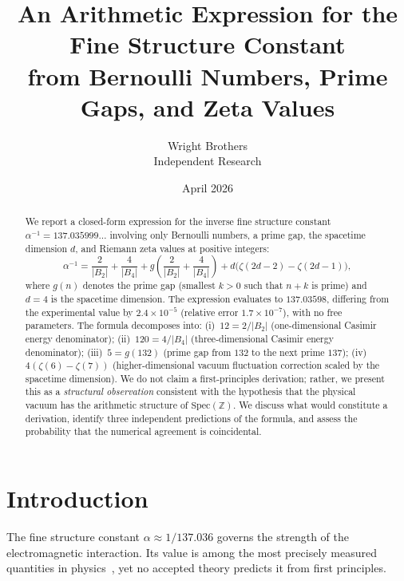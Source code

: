 \documentclass[11pt,a4paper]{article}
\newcommand{\Spec}{\mathrm{Spec}}
\begin{document}
\title{An Arithmetic Expression for the Fine Structure Constant\\
  from Bernoulli Numbers, Prime Gaps, and Zeta Values}

\author{Wright Brothers\\{\small Independent Research}}
\date{April 2026}
\maketitle

\begin{abstract}
We report a closed-form expression for the inverse fine structure
constant $\alpha^{-1} = 137.035999\ldots$ involving only Bernoulli
numbers, a prime gap, the spacetime dimension $d$, and Riemann
zeta values at positive integers:
\begin{equation*}
  \alpha^{-1} = \frac{2}{|B_2|} + \frac{4}{|B_4|}
  + g\!\left(\frac{2}{|B_2|} + \frac{4}{|B_4|}\right)
  + d\bigl(\zeta(2d{-}2) - \zeta(2d{-}1)\bigr),
\end{equation*}
where $g(n)$ denotes the prime gap (smallest $k > 0$ such that
$n + k$ is prime) and $d = 4$ is the spacetime dimension.
The expression evaluates to $137.03598$, differing from the
experimental value by $2.4 \times 10^{-5}$ (relative error
$1.7 \times 10^{-7}$), with no free parameters.
The formula decomposes into: (i)~$12 = 2/|B_2|$
(one-dimensional Casimir energy denominator);
(ii)~$120 = 4/|B_4|$ (three-dimensional Casimir energy denominator);
(iii)~$5 = g(132)$ (prime gap from $132$ to the next prime $137$);
(iv)~$4(\zeta(6) - \zeta(7))$ (higher-dimensional vacuum
fluctuation correction scaled by the spacetime dimension).
We do not claim a first-principles derivation; rather, we
present this as a \emph{structural observation} consistent with
the hypothesis that the physical vacuum has the arithmetic
structure of $\Spec(\mathbb{Z})$.
We discuss what would constitute a derivation, identify three
independent predictions of the formula, and assess the probability
that the numerical agreement is coincidental.
\end{abstract}

\section{Introduction}

The fine structure constant $\alpha \approx 1/137.036$ governs
the strength of the electromagnetic interaction. Its value is
among the most precisely measured quantities in
physics~\cite{Mohr2016}, yet no accepted theory predicts it from
first principles.
\end{document}
